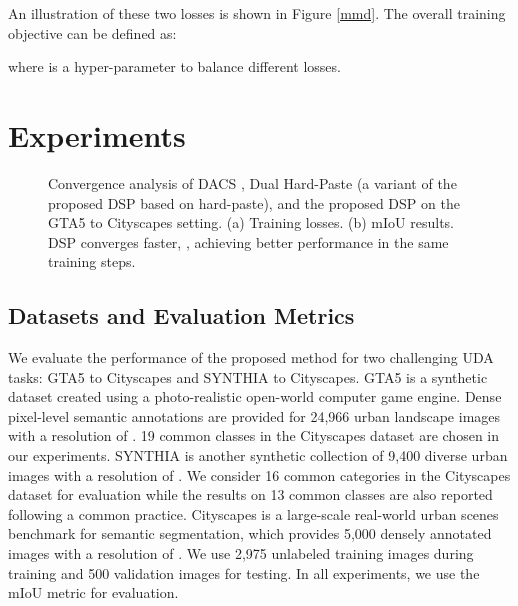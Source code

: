 \documentclass[sigconf]{acmart}
\begin{document}
An illustration of these two losses is shown in Figure \ref{mmd}. The overall training objective can be defined as:

where  is a hyper-parameter to balance different losses. 

\section{Experiments}

\begin{figure}[tbhp]
    \centering
    \caption{Convergence analysis of DACS \cite{dacs}, Dual Hard-Paste (a variant of the proposed DSP based on hard-paste), and the proposed DSP on the GTA5 to Cityscapes setting. (a) Training losses. (b) mIoU results. DSP converges faster, , achieving better performance in the same training steps.}
    \label{loss_miou}
    
\end{figure}
\subsection{Datasets and Evaluation Metrics}
We evaluate the performance of the proposed method for two challenging UDA tasks: GTA5 \cite{GTA5} to Cityscapes \cite{Cityscapes} and SYNTHIA \cite{SYNTHIA} to Cityscapes. GTA5 is a synthetic dataset created using a photo-realistic open-world computer game engine. Dense pixel-level semantic annotations are provided for 24,966 urban landscape images with a resolution of . 19 common classes in the Cityscapes dataset are chosen in our experiments. SYNTHIA is another synthetic collection of 9,400 diverse urban images with a resolution of . We consider 16 common categories in the Cityscapes dataset for evaluation while the results on 13 common classes are also reported following a common practice. Cityscapes is a large-scale real-world urban scenes benchmark for semantic segmentation, which provides 5,000 densely annotated images with a resolution of . We use 2,975 unlabeled training images during training and 500 validation images for testing. In all experiments, we use the mIoU metric for evaluation. 
\end{document}
